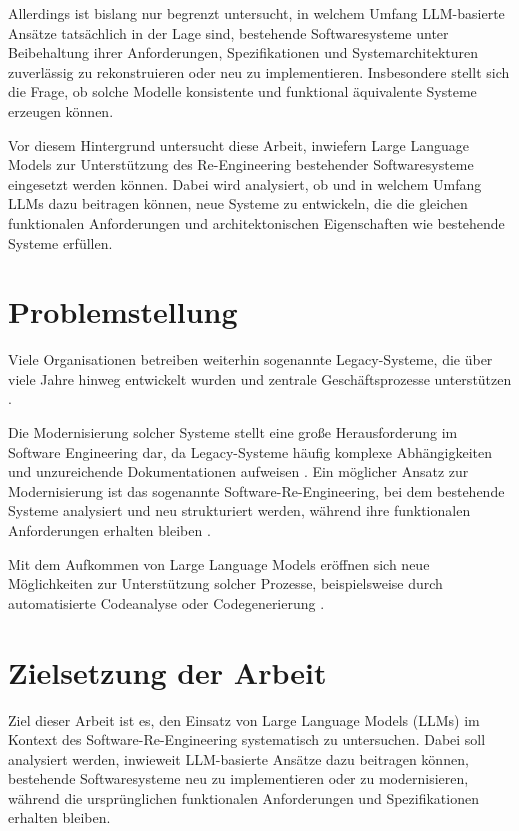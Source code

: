 Allerdings ist bislang nur begrenzt untersucht, in welchem Umfang LLM-basierte Ansätze tatsächlich in der Lage sind, bestehende Softwaresysteme unter Beibehaltung ihrer Anforderungen, Spezifikationen und Systemarchitekturen zuverlässig zu rekonstruieren oder neu zu implementieren. Insbesondere stellt sich die Frage, ob solche Modelle konsistente und funktional äquivalente Systeme erzeugen können.

Vor diesem Hintergrund untersucht diese Arbeit, inwiefern Large Language Models zur Unterstützung des Re-Engineering bestehender Softwaresysteme eingesetzt werden können. Dabei wird analysiert, ob und in welchem Umfang LLMs dazu beitragen können, neue Systeme zu entwickeln, die die gleichen funktionalen Anforderungen und architektonischen Eigenschaften wie bestehende Systeme erfüllen.
\section{Problemstellung}
Viele Organisationen betreiben weiterhin sogenannte Legacy-Systeme, 
die über viele Jahre hinweg entwickelt wurden und zentrale 
Geschäftsprozesse unterstützen \cite{sommerville2016software}. 

Die Modernisierung solcher Systeme stellt eine große Herausforderung 
im Software Engineering dar, da Legacy-Systeme häufig komplexe 
Abhängigkeiten und unzureichende Dokumentationen aufweisen 
\cite{seacord2003modernizing}. 
Ein möglicher Ansatz zur Modernisierung ist das sogenannte 
Software-Re-Engineering, bei dem bestehende Systeme analysiert 
und neu strukturiert werden, während ihre funktionalen 
Anforderungen erhalten bleiben \cite{chikofsky1990reverse}. 

Mit dem Aufkommen von Large Language Models eröffnen sich neue 
Möglichkeiten zur Unterstützung solcher Prozesse, beispielsweise 
durch automatisierte Codeanalyse oder Codegenerierung 
\cite{fan2023largelanguagemodelssoftware}.

\section{Zielsetzung der Arbeit}

Ziel dieser Arbeit ist es, den Einsatz von Large Language Models (LLMs) im Kontext des Software-Re-Engineering systematisch zu untersuchen. 
Dabei soll analysiert werden, inwieweit LLM-basierte Ansätze dazu beitragen können, bestehende Softwaresysteme neu zu implementieren oder zu modernisieren, während die ursprünglichen funktionalen Anforderungen und Spezifikationen erhalten bleiben.

